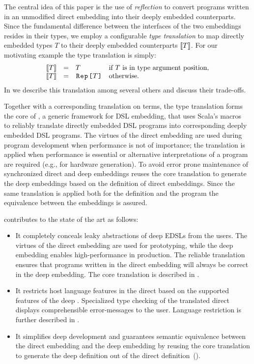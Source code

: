 The central idea of this paper is the use of \emph{reflection} to convert
programs written in an unmodified direct embedding into their deeply
embedded counterparts.  Since the fundamental difference between the
interfaces of the two embeddings resides in their types, we employ a
configurable \emph{type translation} to map directly embedded
types $T$ to their deeply embedded counterparts $\llbracket T \rrbracket$. For our
motivating example the type translation is simply:
\[
\begin{array}{llll}
  \ttrone{T} &=& T   & \text{if $T$ is in type argument position,}  \\
  \ttrone{T} &=& \text{\code{Rep[}}T\text{\code{]}}& \text{otherwise}.
\end{array}
\]
In  we describe this translation among several
others and discuss their trade-offs.

Together with a corresponding translation on terms, the type
translation forms the core of \yy, a generic framework for DSL
embedding, that uses Scala's macros~\cite{burmako_scala_2013} to
reliably translate directly embedded DSL programs into corresponding
deeply embedded DSL programs.  The virtues of the direct embedding are
used during program development when performance is not of importance;
the translation is applied when performance is essential or
alternative interpretations of a program are required (e.g., for
hardware generation).  To avoid error prone maintenance of
synchronized direct and deep embeddings \yy reuses the core
translation to generate the deep embeddings based on the definition of
direct embeddings. Since the same translation is applied both for the
\edsl definition and the \edsl program the equivalence between the
embeddings is assured.

\yy{} contributes to the state of the art as follows:
\begin{itemize}

  \item It completely conceals leaky abstractions of deep EDSLs from the users.
  The virtues of the direct embedding are used for prototyping, while the deep
  embedding enables high-performance in production. The reliable translation
  ensures that programs written in the direct embedding will always be correct
  in the deep embedding. The core translation is described in .

  \item It restricts host language features in the direct \edsl{} based on the
  supported features of the deep \edsl{}. Specialized type checking of the
  translated direct \edsl{} displays comprehensible error-messages to the user.
  Language restriction is further described in .

  \item It simplifies deep \edsl development and guarantees semantic equivalence
  between the direct embedding and the deep embedding by reusing the core
  translation to generate the deep \edsl definition out of the direct \edsl
  definition~().

\end{itemize}

